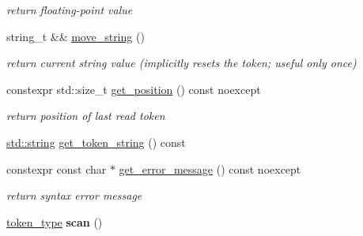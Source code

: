 \begin{DoxyCompactItemize}
\begin{DoxyCompactList}\small\item\em return floating-\/point value \end{DoxyCompactList}\item 
\mbox{\label{classnlohmann_1_1detail_1_1lexer_a6ec5d4429230611dc591dca03da60895}} 
string\+\_\+t \&\& \mbox{\hyperlink{classnlohmann_1_1detail_1_1lexer_a6ec5d4429230611dc591dca03da60895}{move\+\_\+string}} ()
\begin{DoxyCompactList}\small\item\em return current string value (implicitly resets the token; useful only once) \end{DoxyCompactList}\item 
\mbox{\label{classnlohmann_1_1detail_1_1lexer_a2a00465a3d5d70c84809cdb27658db79}} 
constexpr std\+::size\+\_\+t \mbox{\hyperlink{classnlohmann_1_1detail_1_1lexer_a2a00465a3d5d70c84809cdb27658db79}{get\+\_\+position}} () const noexcept
\begin{DoxyCompactList}\small\item\em return position of last read token \end{DoxyCompactList}\item 
\mbox{\hyperlink{namespacenlohmann_1_1detail_a1ed8fc6239da25abcaf681d30ace4985ab45cffe084dd3d20d928bee85e7b0f21}{std\+::string}} \mbox{\hyperlink{classnlohmann_1_1detail_1_1lexer_a4aef7e72e539be04e139c34872421f2a}{get\+\_\+token\+\_\+string}} () const
\item 
\mbox{\label{classnlohmann_1_1detail_1_1lexer_a53cebbc684ef97fa49651eb442d58f86}} 
constexpr const char $\ast$ \mbox{\hyperlink{classnlohmann_1_1detail_1_1lexer_a53cebbc684ef97fa49651eb442d58f86}{get\+\_\+error\+\_\+message}} () const noexcept
\begin{DoxyCompactList}\small\item\em return syntax error message \end{DoxyCompactList}\item 
\mbox{\label{classnlohmann_1_1detail_1_1lexer_aac3041cd2b9291e64fee38db422863c9}} 
\mbox{\hyperlink{classnlohmann_1_1detail_1_1lexer_a3f313cdbe187cababfc5e06f0b69b098}{token\+\_\+type}} {\bfseries scan} ()
\end{DoxyCompactItemize}
